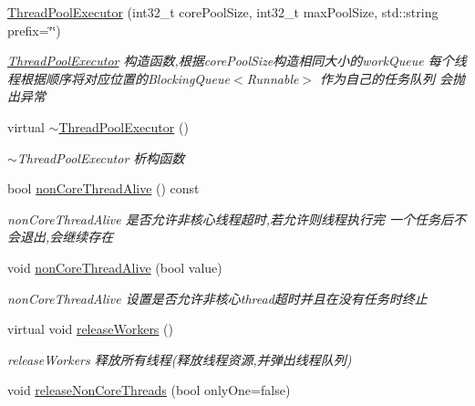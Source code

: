 \begin{DoxyCompactItemize}
\hyperlink{classThreadPoolExecutor_a1d65f9842fd50425cf3ba82c4ffee246}{Thread\+Pool\+Executor} (int32\+\_\+t core\+Pool\+Size, int32\+\_\+t max\+Pool\+Size, std\+::string prefix=\char`\"{}\char`\"{})
\begin{DoxyCompactList}\small\item\em \hyperlink{classThreadPoolExecutor}{Thread\+Pool\+Executor} 构造函数,根据core\+Pool\+Size构造相同大小的work\+Queue 每个线程根据顺序将对应位置的\+Blocking\+Queue$<$\+Runnable$>$ 作为自己的任务队列 会抛出异常 \end{DoxyCompactList}\item 
\mbox{\label{classThreadPoolExecutor_a1d5a1c3330593f243959256d32068c15}} 
virtual \hyperlink{classThreadPoolExecutor_a1d5a1c3330593f243959256d32068c15}{$\sim$\+Thread\+Pool\+Executor} ()
\begin{DoxyCompactList}\small\item\em $\sim$\+Thread\+Pool\+Executor 析构函数 \end{DoxyCompactList}\item 
bool \hyperlink{classThreadPoolExecutor_a334329e0226ed0e540bc3ebc52e8817e}{non\+Core\+Thread\+Alive} () const
\begin{DoxyCompactList}\small\item\em non\+Core\+Thread\+Alive 是否允许非核心线程超时,若允许则线程执行完 一个任务后不会退出,会继续存在 \end{DoxyCompactList}\item 
void \hyperlink{classThreadPoolExecutor_a0079d82c3ef52770771f5954debcdfd7}{non\+Core\+Thread\+Alive} (bool value)
\begin{DoxyCompactList}\small\item\em non\+Core\+Thread\+Alive 设置是否允许非核心thread超时并且在没有任务时终止 \end{DoxyCompactList}\item 
\mbox{\label{classThreadPoolExecutor_a7d4bfa422c41a11fcdd33e7a1b2bcec8}} 
virtual void \hyperlink{classThreadPoolExecutor_a7d4bfa422c41a11fcdd33e7a1b2bcec8}{release\+Workers} ()
\begin{DoxyCompactList}\small\item\em release\+Workers 释放所有线程(释放线程资源,并弹出线程队列) \end{DoxyCompactList}\item 
void \hyperlink{classThreadPoolExecutor_a5d2d340118dd847534533f8bf2e9ae94}{release\+Non\+Core\+Threads} (bool only\+One=false)

\end{DoxyCompactItemize}
